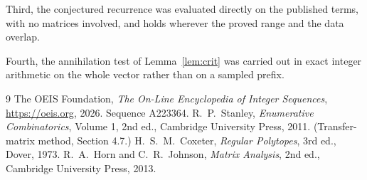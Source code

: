 \documentclass[11pt,a4paper]{article}
\theoremstyle{plain}
\theoremstyle{definition}
\begin{document}
Third, the conjectured recurrence was evaluated directly on the published terms, with no
matrices involved, and holds wherever the proved range and the data overlap.

Fourth, the annihilation test of Lemma~\ref{lem:crit} was carried out in exact integer
arithmetic on the whole vector rather than on a sampled prefix.

\begin{thebibliography}{9}
 The OEIS Foundation, \emph{The On-Line Encyclopedia of Integer
Sequences}, \url{https://oeis.org}, 2026. Sequence A223364.
 R.~P.~Stanley, \emph{Enumerative Combinatorics}, Volume 1, 2nd ed.,
Cambridge University Press, 2011. (Transfer-matrix method, Section 4.7.)
 H.~S.~M.~Coxeter, \emph{Regular Polytopes}, 3rd ed., Dover, 1973.
 R.~A.~Horn and C.~R.~Johnson, \emph{Matrix Analysis}, 2nd ed., Cambridge
University Press, 2013.
\end{thebibliography}
\end{document}
